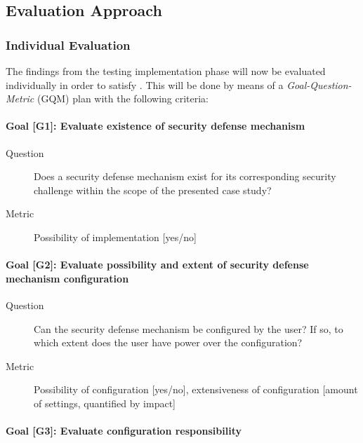 {	\subsection{Evaluation Approach} \label{subsec:approach-structure-evaluation}
	
		\subsubsection{Individual Evaluation} \label{subsubsec:approach-structure-evaluation-individual}
		
		The findings from the testing implementation phase will now be evaluated individually in order to satisfy . This will be done by means of a \textit{Goal-Question-Metric} (GQM) plan with the following criteria:
		
		\paragraph{Goal [G1]: \textbf{Evaluate existence of security defense mechanism}\label{g1}}
			\begin{description}
				\item[Question] Does a security defense mechanism exist for its corresponding security challenge 	within the scope of the presented case study?
				\item[Metric] Possibility of implementation [yes/no] \\
			\end{description}
		
		
		\paragraph{Goal [G2]: \textbf{Evaluate possibility and extent of security defense mechanism configuration}\label{g2}}
		
		\begin{description}
			\item[Question] Can the security defense mechanism be configured by the user? If so, to which extent does the user have power over the configuration?
			\item[Metric] Possibility of configuration [yes/no], extensiveness of configuration [amount of settings, quantified by impact] \\
		\end{description}
		
		
		\paragraph{Goal [G3]: \textbf{Evaluate configuration responsibility}\label{g3}}
		
}
